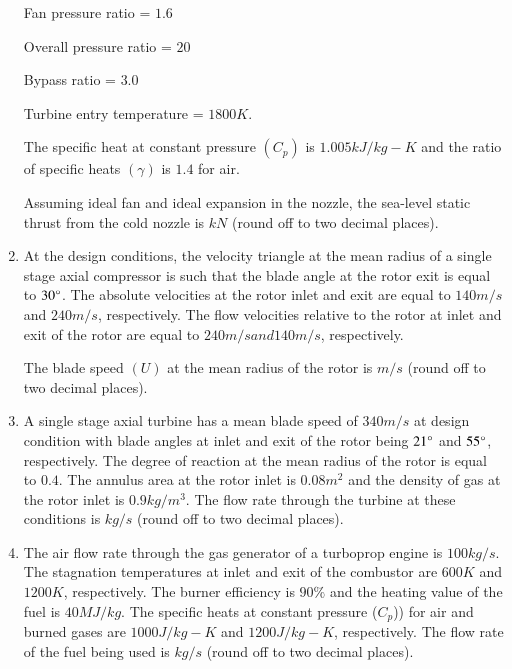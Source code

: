 \documentclass[journal]{IEEEtran}
\begin{document}
\begin{enumerate}
Fan pressure ratio = $1.6$

Overall pressure ratio = $20$

Bypass ratio = $3.0$

Turbine entry temperature = $1800 K$.

        The specific heat at constant pressure $(C_{p})$ is $1.005 kJ/kg-K$ and the ratio of specific heats $(\gamma)$ is $1.4$ for air.

Assuming ideal fan and ideal expansion in the nozzle, the sea-level static thrust from the cold nozzle is \underline{\hspace{1cm}} $kN$ (round off to two decimal places). 

    \item At the design conditions, the velocity triangle at the mean radius of a single stage axial compressor is such that the blade angle at the rotor exit is equal to $30\degree$. The absolute velocities at the rotor inlet and exit are equal to $140 m/s$ and $240 m/s$, respectively. The flow velocities relative to the rotor at inlet and exit of the rotor are equal to $240 m/s and 140 m/s$, respectively.
        \begin{figure}[!ht]
            \centering
            
        \end{figure}
        The blade speed $(U)$ at the mean radius of the rotor is \underline{\hspace{1cm}} $m/s$ (round off to two decimal places).

    \item A single stage axial turbine has a mean blade speed of $340 m/s$ at design condition with blade angles at inlet and exit of the rotor being $21\degree$ and $55\degree$, respectively. The degree of reaction at the mean radius of the rotor is equal to $0.4$. The annulus area at the rotor inlet is $0.08 m^2$ and the density of gas at the rotor inlet is $0.9 kg/m^3$. The flow rate through the turbine at these conditions is \underline{\hspace{1cm}} $kg/s$ (round off to two decimal places). 

    \item The air flow rate through the gas generator of a turboprop engine is $100 kg/s$. The stagnation temperatures at inlet and exit of the combustor are $600 K$ and $1200 K$, respectively. The burner efficiency is $90\%$ and the heating value of the fuel is $40 MJ/kg$. The specific heats at constant pressure ($C_{p}$)) for air and burned gases are $1000 J/kg-K$ and $1200 J/kg-K$, respectively. The flow rate of the fuel being used is \underline{\hspace{1cm}} $kg/s$ (round off to two decimal places).


\end{enumerate}
\end{document}
